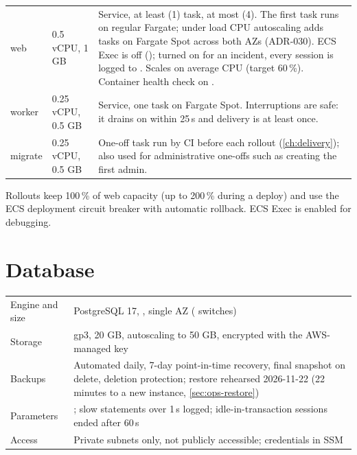 \begin{xltabular}{\linewidth}{@{}P{22mm} P{30mm} L@{}}
  \toprule
   &  & \\
  \midrule
  web & 0.5 vCPU, 1 GB & Service, at least  (1) task, at most  (4). The first task runs on regular Fargate; under load CPU autoscaling adds tasks on Fargate Spot across both AZs (ADR-030). ECS Exec is off (); turned on for an incident, every session is logged to . Scales on average CPU (target 60\,\%). Container health check on .\\
  worker & 0.25 vCPU, 0.5 GB & Service, one task on Fargate Spot. Interruptions are safe: it drains on  within 25\,s and delivery is at least once.\\
  migrate & 0.25 vCPU, 0.5 GB & One-off task run by CI before each rollout (\cref{ch:delivery}); also used for administrative one-offs such as creating the first admin.\\
  \bottomrule
\end{xltabular}

Rollouts keep 100\,\% of web capacity (up to 200\,\% during a deploy) and use the ECS deployment
circuit breaker with automatic rollback. ECS Exec is enabled for debugging.

\section{Database}
\begin{xltabular}{\linewidth}{@{}P{38mm} L@{}}
  \toprule
   & \\
  \midrule
  Engine and size & PostgreSQL 17, , single AZ ( switches)\\
  Storage & gp3, 20 GB, autoscaling to 50 GB, encrypted with the AWS-managed key\\
  Backups & Automated daily, 7-day point-in-time recovery, final snapshot on delete, deletion protection; restore rehearsed 2026-11-22 (22 minutes to a new instance, \cref{sec:ops-restore})\\
  Parameters & ; slow statements over 1\,s logged; idle-in-transaction sessions ended after 60\,s\\
  Access & Private subnets only, not publicly accessible; credentials in SSM\\
  \bottomrule
\end{xltabular}

